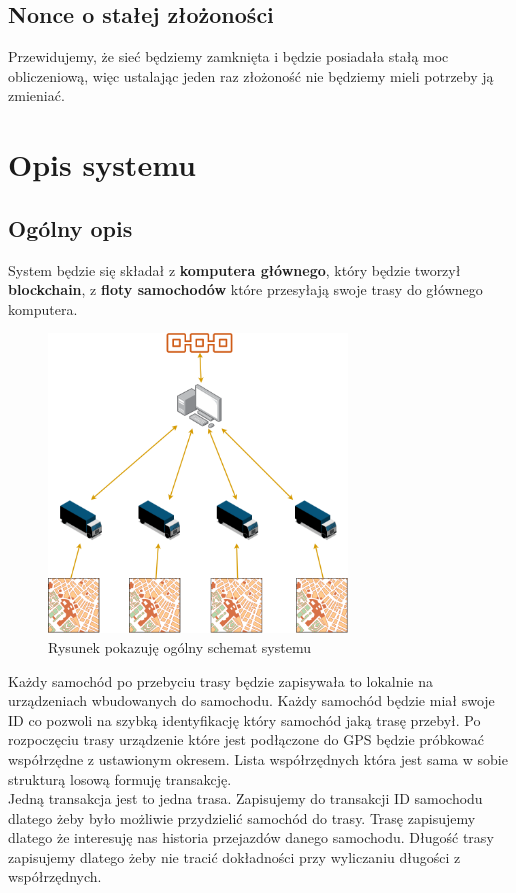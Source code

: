 \documentclass{sprawozdanie-agh}
\begin{document}
\subsection{Nonce o stałej złożoności}
        Przewidujemy, że sieć będziemy zamknięta i będzie posiadała stałą moc obliczeniową, więc ustalając jeden raz złożoność nie będziemy mieli potrzeby ją zmieniać.


\section{Opis systemu} 
\subsection{Ogólny opis}
System będzie się składał z \textbf{komputera głównego}, który będzie tworzył \textbf{blockchain}, z \textbf{floty samochodów} które przesyłają swoje trasy do głównego komputera.
\begin{figure}[htbp]
    \centerline{\includegraphics[width=300px, height=300px]{system_sheme.png}}
    \caption{Rysunek pokazuję ogólny schemat systemu}
    \label{fig}
\end{figure}
Każdy samochód po przebyciu trasy będzie zapisywała to lokalnie na urządzeniach wbudowanych do samochodu. Każdy samochód będzie miał swoje ID co pozwoli na szybką identyfikację który samochód jaką trasę przebył. Po rozpoczęciu trasy urządzenie które jest podłączone do GPS będzie próbkować współrzędne z ustawionym okresem. Lista współrzędnych która jest sama w sobie strukturą losową formuję transakcję. \\  
Jedną transakcja jest to jedna trasa. Zapisujemy do transakcji ID samochodu dlatego żeby było możliwie przydzielić samochód do trasy. Trasę zapisujemy dlatego że interesuję nas historia przejazdów danego samochodu. Długość trasy zapisujemy dlatego żeby nie tracić dokładności przy wyliczaniu długości z współrzędnych. 
\newpage
\end{document}

